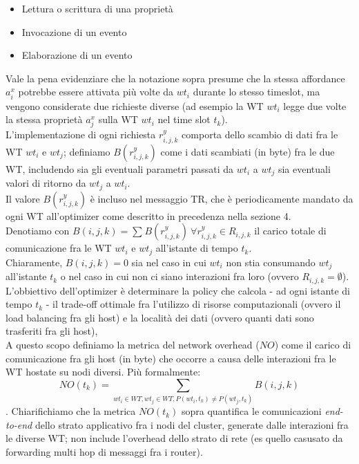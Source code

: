 \documentclass[11pt]{article}
\begin{document}
		\begin{itemize}
			\item Lettura o scrittura di una proprietà
			\item Invocazione di un evento
			\item Elaborazione di un evento
		\end{itemize}
		Vale la pena evidenziare che la notazione sopra presume che la stessa affordance $a_i^x$ potrebbe essere attivata più volte da $wt_i$ durante lo stesso timeslot, ma vengono considerate due richieste diverse (ad esempio la WT $wt_i$ legge due volte la stessa proprietà $a^x_j$ sulla WT $wt_i$ nel time slot $t_k$). \\
		L'implementazione di ogni richiesta $r^y_{i,j,k}$ comporta dello scambio di dati fra le WT $wt_i$ e $wt_j$; definiamo $B(r^y_{i,j,k})$ come i dati scambiati (in byte) fra le due WT, includendo sia gli eventuali parametri passati da $wt_i$ a $wt_j$ sia eventuali valori di ritorno da $wt_j$ a $wt_i$. \\
		Il valore $B(r^y_{i,j,k})$ è incluso nel messaggio TR, che è periodicamente mandato da ogni WT all'optimizer come descritto in precedenza nella sezione 4. \\
		Denotiamo con $B(i, j, k) = \sum_{}^{} B(r^y_{i,j,k}) \  \forall r^y_{i,j,k} \in R_{i,j,k}$ il carico totale di comunicazione fra le WT $wt_i$ e $wt_j$ all'istante di tempo $t_k$. \\
		Chiaramente, $B(i, j, k) = 0$ sia nel caso in cui $wt_i$ non stia consumando $wt_j$ all'istante $t_k$ o nel caso in cui non ci siano interazioni fra loro (ovvero $R_{i,j,k} = \emptyset$). \\
		L'obbiettivo dell'optimizer è determinare la policy che calcola - ad ogni istante di tempo $t_k$ - il trade-off ottimale fra l'utilizzo di risorse computazionali (ovvero il load balancing fra gli host) e la località dei dati (ovvero quanti dati sono trasferiti fra gli host), \\
		A questo scopo definiamo la metrica del network overhead ($NO$) come il carico di comunicazione fra gli host (in byte) che occorre a causa delle interazioni fra le WT hostate su nodi diversi. Più formalmente:
		\[
			NO(t_k) = \sum_{wt_i \in WT, wt_j \in WT, P(wt_i, t_k) \neq P(wt_j, t_k)} B(i,j,k)
		\].
		Chiarifichiamo che la metrica $NO(t_k)$ sopra quantifica le comunicazioni \textit{end-to-end} dello strato applicativo fra i nodi del cluster, generate dalle interazioni fra le diverse WT; non include l'overhead dello strato di rete (es quello casusato da forwarding multi hop di messaggi fra i router). \\
\end{document}
